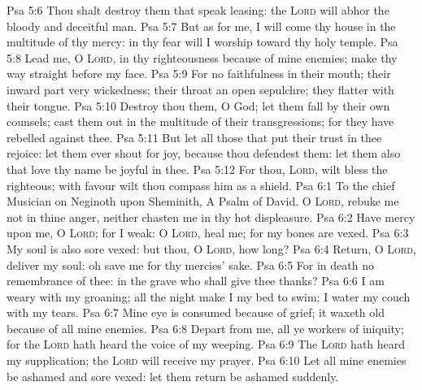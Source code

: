 \vs Psa 5:6 Thou shalt destroy them that speak leasing: the \textsc{Lord} will abhor the bloody and deceitful man.
\vs Psa 5:7 But as for me, I will come  thy house in the multitude of thy mercy:  in thy fear will I worship toward thy holy temple.
\vs Psa 5:8 Lead me, O \textsc{Lord}, in thy righteousness because of mine enemies; make thy way straight before my face.
\vs Psa 5:9 For  no faithfulness in their mouth; their inward part  very wickedness; their throat  an open sepulchre; they flatter with their tongue.
\vs Psa 5:10 Destroy thou them, O God; let them fall by their own counsels; cast them out in the multitude of their transgressions; for they have rebelled against thee.
\vs Psa 5:11 But let all those that put their trust in thee rejoice: let them ever shout for joy, because thou defendest them: let them also that love thy name be joyful in thee.
\vs Psa 5:12 For thou, \textsc{Lord}, wilt bless the righteous; with favour wilt thou compass him as  a shield.
\vs Psa 6:1 To the chief Musician on Neginoth upon Sheminith, A Psalm of David. O \textsc{Lord}, rebuke me not in thine anger, neither chasten me in thy hot displeasure.
\vs Psa 6:2 Have mercy upon me, O \textsc{Lord}; for I  weak: O \textsc{Lord}, heal me; for my bones are vexed.
\vs Psa 6:3 My soul is also sore vexed: but thou, O \textsc{Lord}, how long?
\vs Psa 6:4 Return, O \textsc{Lord}, deliver my soul: oh save me for thy mercies' sake.
\vs Psa 6:5 For in death  no remembrance of thee: in the grave who shall give thee thanks?
\vs Psa 6:6 I am weary with my groaning; all the night make I my bed to swim; I water my couch with my tears.
\vs Psa 6:7 Mine eye is consumed because of grief; it waxeth old because of all mine enemies.
\vs Psa 6:8 Depart from me, all ye workers of iniquity; for the \textsc{Lord} hath heard the voice of my weeping.
\vs Psa 6:9 The \textsc{Lord} hath heard my supplication; the \textsc{Lord} will receive my prayer.
\vs Psa 6:10 Let all mine enemies be ashamed and sore vexed: let them return  be ashamed suddenly.
